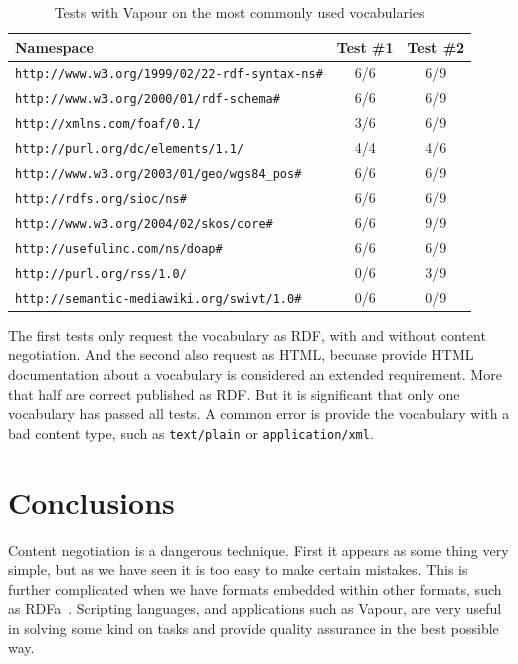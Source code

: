 \documentclass{../templates/llncs}
\begin{document}
\begin{table}
\caption{Tests with Vapour on the most commonly used vocabularies}
\centering
\begin{tabular}{lcc}
\hline
Namespace & Test \#1 & Test \#2 \\
\hline\hline
\texttt{http://www.w3.org/1999/02/22-rdf-syntax-ns\#} & 6/6 & 6/9 \\
\texttt{http://www.w3.org/2000/01/rdf-schema\#} & 6/6 & 6/9 \\
\texttt{http://xmlns.com/foaf/0.1/} & 3/6 & 6/9 \\
\texttt{http://purl.org/dc/elements/1.1/} & 4/4 & 4/6 \\
\texttt{http://www.w3.org/2003/01/geo/wgs84\_pos\#} & 6/6 & 6/9 \\
\texttt{http://rdfs.org/sioc/ns\#} & 6/6 & 6/9 \\
\texttt{http://www.w3.org/2004/02/skos/core\#} & 6/6 & 9/9 \\
\texttt{http://usefulinc.com/ns/doap\#} & 6/6 & 6/9 \\
\texttt{http://purl.org/rss/1.0/} & 0/6 & 3/9 \\
\texttt{http://semantic-mediawiki.org/swivt/1.0\#} & 0/6 & 0/9 \\ [1ex]
\hline
\end{tabular}
\label{tab:usage}
\end{table}

The first tests only request the vocabulary as RDF, with and without content 
negotiation. And the second also request as HTML, becuase provide HTML 
documentation about a vocabulary is considered an extended requirement. More 
that half are correct published as RDF. But it is significant that only one 
vocabulary has passed all tests. A common error is provide the vocabulary with 
a bad content type, such as \texttt{text/plain} or \texttt{application/xml}.

\section{\label{sec:conclusions}Conclusions}

Content negotiation is a dangerous technique. First it appears as some thing very 
simple, but as we have seen it is too easy to make certain mistakes. This is 
further complicated when we have formats embedded within other formats,
such as RDFa~\cite{Birbeck2006}. Scripting languages, and applications such as 
Vapour, are very useful in solving some kind on tasks and provide quality 
assurance in the best possible way.
\end{document}
